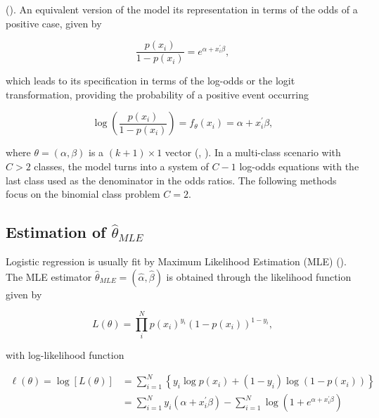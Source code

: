(\cite{montesinos2022multivariate}). An equivalent version of the model its representation in terms of the odds of a positive case, given by

\begin{equation}
    \frac{p(x_i)}{1-p(x_i)} =e^{\alpha + x_i^\prime \beta},
    \label{eqn:odds} 
\end{equation} 

which leads to its specification in terms of the log-odds or the logit transformation, providing the probability of a positive event occurring

\begin{equation}
    \log \left(\frac{p(x_i)}{1-p(x_i)}\right) = f_\theta (x_i) = \alpha + x_i^\prime \beta,
    \label{eqn:log-odds}
\end{equation}

where $\theta = (\alpha, \beta)$ is a $(k+1)\times 1$ vector (\cite{mccullagh1989}, \cite{hastie2014}). In a multi-class scenario with $C>2$ classes, the model turns into a system of $C-1$ log-odds equations with the last class used as the denominator in the odds ratios. The following methods focus on the binomial class problem $C=2$.


\subsection{Estimation of $\widehat{\theta}_{MLE}$}
\label{sec:mle}

Logistic regression is usually fit by  Maximum Likelihood Estimation (MLE) (\cite{hastie2009elements}). The MLE estimator $\widehat{\theta}_{MLE} = (\widehat{\alpha}, \widehat{\beta})$ is obtained through the likelihood function given by

\begin{equation}
    L(\theta) = \prod_{i}^{N} p(x_i)^{y_i}\left(1- p(x_i)\right)^{1-y_i},
    \label{eqn:likelihood}
\end{equation}

with log-likelihood function

\begin{align}
    \ell(\theta)=\log [L(\theta)] &= \sum_{i=1}^N\left\{y_i \log p\left(x_i\right)+\left(1-y_i\right) \log \left(1-p\left(x_i \right)\right)\right\} \\
    & = \sum_{i=1}^N y_i\left(\alpha+ x_i^{\prime} \beta\right)-\sum_{i=1}^N \log \left(1+ e^{\alpha+ x_i^{\prime} \beta} \right)
    \label{eqn:log-likelihood}
\end{align}



